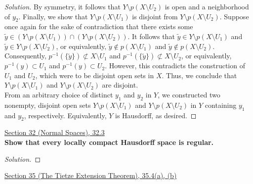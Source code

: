 \documentclass[11pt]{article}
\newenvironment{solution}
  {\renewcommand\qedsymbol{$\blacksquare$}\begin{proof}[Solution]}
  {\end{proof}}
\begin{document}
\begin{enumerate}[a)]
\begin{solution}
        By symmetry, it follows that $Y \setminus p(X \setminus U_2 )$ is open and a neighborhood of $y_2$. Finally, we show that $Y \setminus p(X \setminus U_1)$ is disjoint from $Y \setminus p(X \setminus U_2)$.
        Suppose once again for the sake of contradiction that there exists some $\tilde{y} \in (Y \setminus p(X \setminus U_1)) \cap (Y\setminus p(X \setminus U_2))$. It follows that $\tilde{y} \in Y \setminus p(X \setminus U_1)$ and $\tilde{y} \in Y \setminus p(X \setminus U_2)$, or equivalently,
        $\tilde{y} \notin p(X \setminus U_1)$ and $\tilde{y} \notin p(X \setminus U_2)$. Consequently, $p^{-1}(\{ \tilde{y} \}) \not\subset X \setminus U_1$ and $p^{-1}(\{ \tilde{y} \}) \not\subset X \setminus U_2$, or equivalently, 
        $p^{-1}({y}) \subset U_1$ and $p^{-1}({y}) \subset U_2$. However, this contradicts the construction of $U_1$ and $U_2$, which were to be disjoint open sets in $X$. Thus, we conclude that
        $Y \setminus p(X \setminus U_1)$ and $Y \setminus p(X \setminus U_2)$ are disjoint. \\

        From an arbitrary choice of distinct $y_1$ and $y_2$ in $Y$, we constructed two nonempty, disjoint open sets  $Y \setminus p(X \setminus U_1)$ and $Y \setminus p(X \setminus U_2)$ in $Y$ containing $y_1$ and $y_2$, respectively. Equivalently, $Y$ is Hausdorff, as desired.
    \end{solution}
\end{enumerate}

\newpage

\underline{Section 32 (Normal Spaces), 32.3} \\

\textbf{Show that every locally compact Hausdorff space is regular.}

\begin{solution}
    
\end{solution}

\newpage

\underline{Section 35 (The Tietze Extension Theorem), 35.4(a), (b)} \\
\end{document}
